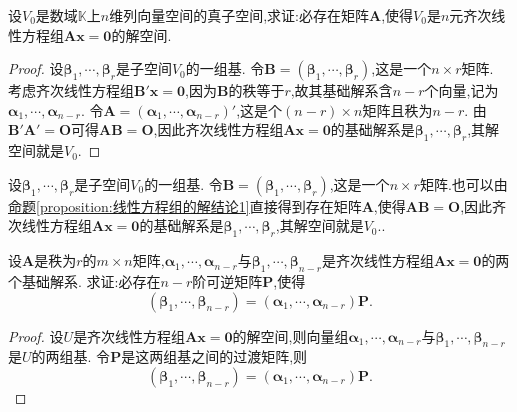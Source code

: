 \documentclass[../../main.tex]{subfiles}%
\begin{document}
\begin{proposition}\label{proposition:一个线性子空间对应一个线性方程组的系数矩阵}
设\(V_0\)是数域\(\mathbb{K}\)上\(n\)维列向量空间的真子空间,求证:必存在矩阵\(\boldsymbol{A}\),使得\(V_0\)是\(n\)元齐次线性方程组\(\boldsymbol{A}\boldsymbol{x}=\boldsymbol{0}\)的解空间.
\end{proposition}
\begin{proof}

设\(\boldsymbol{\beta}_1,\cdots,\boldsymbol{\beta}_r\)是子空间\(V_0\)的一组基. 令\(\boldsymbol{B}=(\boldsymbol{\beta}_1,\cdots,\boldsymbol{\beta}_r)\),这是一个\(n\times r\)矩阵. 考虑齐次线性方程组\(\boldsymbol{B}'\boldsymbol{x}=\boldsymbol{0}\),因为\(\boldsymbol{B}\)的秩等于\(r\),故其基础解系含\(n - r\)个向量,记为\(\boldsymbol{\alpha}_1,\cdots,\boldsymbol{\alpha}_{n - r}\). 令\(\boldsymbol{A}=(\boldsymbol{\alpha}_1,\cdots,\boldsymbol{\alpha}_{n - r})'\),这是个\((n - r)\times n\)矩阵且秩为\(n - r\). 由\(\boldsymbol{B}'\boldsymbol{A}'=\boldsymbol{O}\)可得\(\boldsymbol{A}\boldsymbol{B}=\boldsymbol{O}\),因此齐次线性方程组\(\boldsymbol{A}\boldsymbol{x}=\boldsymbol{0}\)的基础解系是\(\boldsymbol{\beta}_1,\cdots,\boldsymbol{\beta}_r\),其解空间就是\(V_0\).

\end{proof}
\begin{remark}
设\(\boldsymbol{\beta}_1,\cdots,\boldsymbol{\beta}_r\)是子空间\(V_0\)的一组基. 令\(\boldsymbol{B}=(\boldsymbol{\beta}_1,\cdots,\boldsymbol{\beta}_r)\),这是一个\(n\times r\)矩阵.也可以由\hyperref[proposition:线性方程组的解结论1]{命题\ref{proposition:线性方程组的解结论1}}直接得到存在矩阵$\boldsymbol{A}$,使得\(\boldsymbol{A}\boldsymbol{B}=\boldsymbol{O}\),因此齐次线性方程组\(\boldsymbol{A}\boldsymbol{x}=\boldsymbol{0}\)的基础解系是\(\boldsymbol{\beta}_1,\cdots,\boldsymbol{\beta}_r\),其解空间就是\(V_0\)..
\end{remark}

\begin{example}
设\(\boldsymbol{A}\)是秩为\(r\)的\(m\times n\)矩阵,\(\boldsymbol{\alpha}_1,\cdots,\boldsymbol{\alpha}_{n - r}\)与\(\boldsymbol{\beta}_1,\cdots,\boldsymbol{\beta}_{n - r}\)是齐次线性方程组\(\boldsymbol{A}\boldsymbol{x}=\boldsymbol{0}\)的两个基础解系. 求证:必存在\(n - r\)阶可逆矩阵\(\boldsymbol{P}\),使得
\[
(\boldsymbol{\beta}_1,\cdots,\boldsymbol{\beta}_{n - r})=(\boldsymbol{\alpha}_1,\cdots,\boldsymbol{\alpha}_{n - r})\boldsymbol{P}.
\]
\end{example}
\begin{proof}

设\(U\)是齐次线性方程组\(\boldsymbol{A}\boldsymbol{x}=\boldsymbol{0}\)的解空间,则向量组\(\boldsymbol{\alpha}_1,\cdots,\boldsymbol{\alpha}_{n - r}\)与\(\boldsymbol{\beta}_1,\cdots,\boldsymbol{\beta}_{n - r}\)是\(U\)的两组基. 令\(\boldsymbol{P}\)是这两组基之间的过渡矩阵,则
\[
(\boldsymbol{\beta}_1,\cdots,\boldsymbol{\beta}_{n - r})=(\boldsymbol{\alpha}_1,\cdots,\boldsymbol{\alpha}_{n - r})\boldsymbol{P}. 
\]  

\end{proof}
\end{document}
